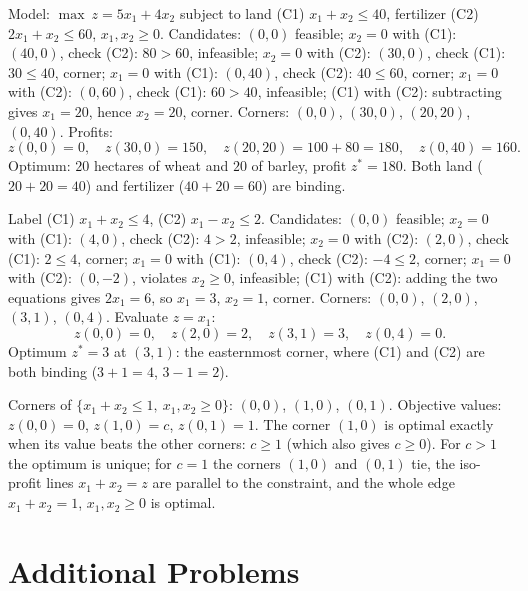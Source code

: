 \begin{solutions}
  \item Model: $\max\ z=5x_{1}+4x_{2}$ subject to land (C1)
        $x_{1}+x_{2}\le 40$, fertilizer (C2) $2x_{1}+x_{2}\le 60$,
        $x_{1},x_{2}\ge 0$. Candidates: $(0,0)$ feasible; $x_{2}=0$
        with (C1): $(40,0)$, check (C2): $80>60$, infeasible;
        $x_{2}=0$ with (C2): $(30,0)$, check (C1): $30\le 40$, corner;
        $x_{1}=0$ with (C1): $(0,40)$, check (C2): $40\le 60$, corner;
        $x_{1}=0$ with (C2): $(0,60)$, check (C1): $60>40$,
        infeasible; (C1) with (C2): subtracting gives $x_{1}=20$,
        hence $x_{2}=20$, corner. Corners: $(0,0)$, $(30,0)$,
        $(20,20)$, $(0,40)$. Profits:
        \[
          z(0,0)=0,\quad z(30,0)=150,\quad z(20,20)=100+80=180,\quad
          z(0,40)=160 .
        \]
        Optimum: $20$ hectares of wheat and $20$ of barley, profit
        $z^{*}=180$. Both land ($20+20=40$) and fertilizer
        ($40+20=60$) are binding.

  \item Label (C1) $x_{1}+x_{2}\le 4$, (C2) $x_{1}-x_{2}\le 2$.
        Candidates: $(0,0)$ feasible; $x_{2}=0$ with (C1): $(4,0)$,
        check (C2): $4>2$, infeasible; $x_{2}=0$ with (C2): $(2,0)$,
        check (C1): $2\le 4$, corner; $x_{1}=0$ with (C1): $(0,4)$,
        check (C2): $-4\le 2$, corner; $x_{1}=0$ with (C2): $(0,-2)$,
        violates $x_{2}\ge 0$, infeasible; (C1) with (C2): adding the
        two equations gives $2x_{1}=6$, so $x_{1}=3$, $x_{2}=1$,
        corner. Corners: $(0,0)$, $(2,0)$, $(3,1)$, $(0,4)$. Evaluate
        $z=x_{1}$:
        \[
          z(0,0)=0,\quad z(2,0)=2,\quad z(3,1)=3,\quad z(0,4)=0 .
        \]
        Optimum $z^{*}=3$ at $(3,1)$: the easternmost corner, where
        (C1) and (C2) are both binding ($3+1=4$, $3-1=2$).

  \item Corners of $\{x_{1}+x_{2}\le 1,\ x_{1},x_{2}\ge 0\}$: $(0,0)$,
        $(1,0)$, $(0,1)$. Objective values: $z(0,0)=0$, $z(1,0)=c$,
        $z(0,1)=1$. The corner $(1,0)$ is optimal exactly when its
        value beats the other corners: $c\ge 1$ (which also gives
        $c\ge 0$). For $c>1$ the optimum is unique; for $c=1$ the
        corners $(1,0)$ and $(0,1)$ tie, the iso-profit lines
        $x_{1}+x_{2}=z$ are parallel to the constraint, and the whole
        edge $x_{1}+x_{2}=1$, $x_{1},x_{2}\ge 0$ is optimal.
\end{solutions}

\section{Additional Problems}

